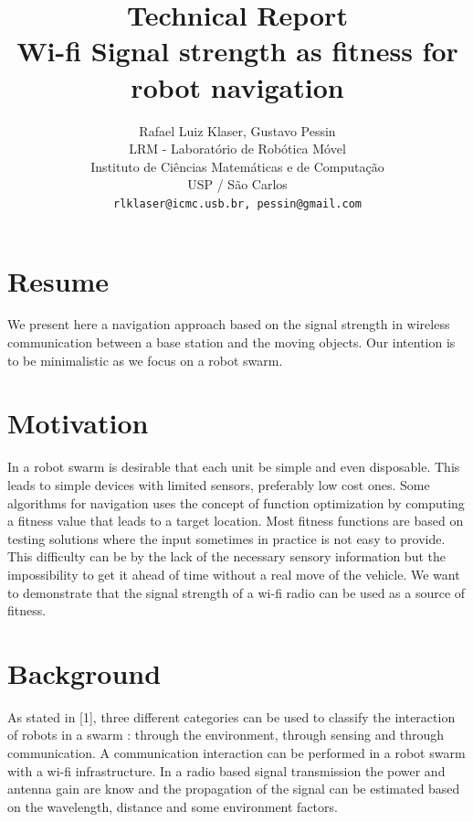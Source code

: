 \documentclass[11pt,a4paper,oneside,twocolumn]{article}
\author{Rafael Luiz Klaser, Gustavo Pessin\\
LRM - Laborat\'orio de Rob\'otica M\'ovel\\
Instituto de Ci\^encias Matem\'aticas e de Computa\c{c}\~ao\\
USP / S\~ao Carlos\\
\texttt{rlklaser@icmc.usb.br, pessin@gmail.com}
}
\title{Technical Report \\ Wi-fi Signal strength as fitness for robot navigation}
\begin{document}
\maketitle
\section*{Resume}

We present here a navigation approach based on the signal strength in wireless
communication between a base station and the moving objects. Our intention is to
be minimalistic as we focus on a robot swarm. 


\section{Motivation}

In a robot swarm is desirable that each unit be simple and even disposable. This
leads to simple devices with limited sensors, preferably low cost ones. Some
algorithms for navigation uses the concept of function optimization by computing
a fitness value that leads to a target location. Most fitness functions are
based on testing solutions where the input sometimes in practice is not easy to
provide. This difficulty can be by the lack of the necessary sensory information
but the impossibility to get it ahead of time without a real move of the
vehicle. We want to demonstrate that the signal strength of a wi-fi radio can be
used as a source of fitness.

\section{Background}

As stated in [1], three different categories can be used to classify the
interaction of robots in a swarm : through the environment, through sensing and
through communication. A communication interaction can be performed in a robot
swarm with a wi-fi infrastructure. In a radio based signal transmission the
power and antenna gain are know and the propagation of the signal can be
estimated based on the wavelength, distance and some environment factors.
\end{document}
